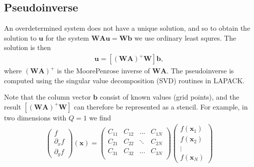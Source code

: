 \documentclass[letterpaper,10pt,english]{sphinxmanual}
\begin{document}
\subsection{Pseudo\sphinxhyphen{}inverse}
\label{\detokenize{Utilities/LeastSquares:pseudo-inverse}}
\sphinxAtStartPar
An over\sphinxhyphen{}determined system does not have a unique solution, and so to obtain the solution to \(\mathbf{u}\) for the system \(\mathbf{W}\mathbf{A}\mathbf{u} = \mathbf{W}\mathbf{b}\) we use ordinary least squres.
The solution is then
\begin{equation*}
\begin{split}\mathbf{u} = \left[\left(\mathbf{W}\mathbf{A}\right)^+ \mathbf{W}\right]\mathbf{b},\end{split}
\end{equation*}
\sphinxAtStartPar
where \(\left(\mathbf{W}\mathbf{A}\right)^+\) is the Moore\sphinxhyphen{}Penrose inverse of \(\mathbf{W}\mathbf{A}\).
The pseudo\sphinxhyphen{}inverse is computed using the singular value decomposition (SVD) routines in LAPACK.

\sphinxAtStartPar
Note that the column vector \(\mathbf{b}\) consist of known values (grid points), and the result \(\left[\left(\mathbf{W}\mathbf{A}\right)^+ \mathbf{W}\right]\) can therefore be represented as a stencil.
For example, in two dimensions with \(Q = 1\) we find
\begin{equation*}
\begin{split}\begin{pmatrix}
f            \\
\partial_x f \\
\partial_y f
\end{pmatrix}(\mathbf{x})
=
\begin{pmatrix}
C_{11} & C_{12} & \ldots & C_{1N} \\
C_{21} & C_{22} & \ddots & C_{2N} \\
C_{31} & C_{32} & \ldots & C_{3N} \\
\end{pmatrix}
\begin{pmatrix}
f(\mathbf{x}_1) \\
f(\mathbf{x}_2) \\
\vdots \\
f(\mathbf{x}_N)
\end{pmatrix}\end{split}
\end{equation*}
\end{document}
